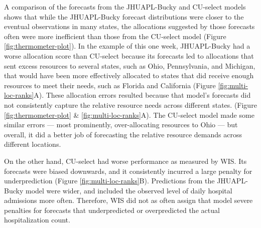 \documentclass{article}\usepackage[]{graphicx}\usepackage[]{xcolor}
\begin{document}
A comparison of the forecasts from the JHUAPL-Bucky and CU-select models shows that while the JHUAPL-Bucky forecast distributions were closer to the eventual observations in many states, the allocations suggested by those forecasts often were more inefficient than those from the CU-select model (Figure \ref{fig:thermometer-plot}).
In the example of this one week, JHUAPL-Bucky had a worse allocation score than CU-select because its forecasts led to allocations that sent excess resources to several states, such as Ohio, Pennsylvania, and Michigan, that would have been more effectively allocated to states that did receive enough resources to meet their needs, such as Florida and California (Figure \ref{fig:multi-loc-ranks}A). These allocation errors resulted because that model’s forecasts did not consistently capture the relative resource needs across different states. (Figure \ref{fig:thermometer-plot} \& \ref{fig:multi-loc-ranks}A). The CU-select model made some similar errors — most prominently, over-allocating resources to Ohio — but overall, it did a better job of forecasting the relative resource demands across different locations.

On the other hand, CU-select had worse performance as measured by WIS. Its forecasts were biased downwards, and it consistently incurred a large penalty for underprediction (Figure \ref{fig:multi-loc-ranks}B). Predictions from the JHUAPL-Bucky model were wider, and included the observed level of daily hospital admissions more often. Therefore, WIS did not as often assign that model severe penalties for forecasts that underpredicted or overpredicted the actual hospitalization count.

\end{document}
